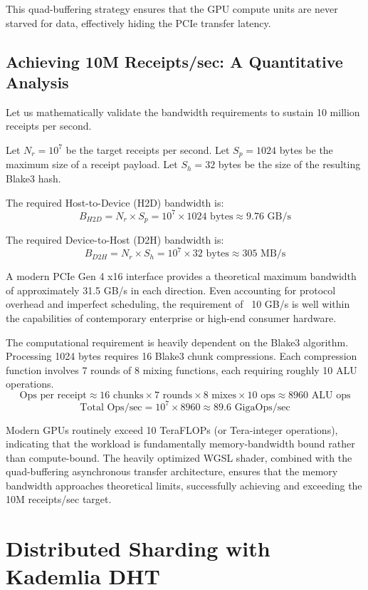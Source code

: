 This quad-buffering strategy ensures that the GPU compute units are never starved for data, effectively hiding the PCIe transfer latency.

\subsection{Achieving 10M Receipts/sec: A Quantitative Analysis}

Let us mathematically validate the bandwidth requirements to sustain 10 million receipts per second.

Let $N_r = 10^7$ be the target receipts per second.
Let $S_p = 1024$ bytes be the maximum size of a receipt payload.
Let $S_h = 32$ bytes be the size of the resulting Blake3 hash.

The required Host-to-Device (H2D) bandwidth is:
$$B_{H2D} = N_r \times S_p = 10^7 \times 1024 \text{ bytes} \approx 9.76 \text{ GB/s}$$

The required Device-to-Host (D2H) bandwidth is:
$$B_{D2H} = N_r \times S_h = 10^7 \times 32 \text{ bytes} \approx 305 \text{ MB/s}$$

A modern PCIe Gen 4 x16 interface provides a theoretical maximum bandwidth of approximately 31.5 GB/s in each direction. Even accounting for protocol overhead and imperfect scheduling, the requirement of ~10 GB/s is well within the capabilities of contemporary enterprise or high-end consumer hardware.

The computational requirement is heavily dependent on the Blake3 algorithm. Processing 1024 bytes requires 16 Blake3 chunk compressions. Each compression function involves 7 rounds of 8 mixing functions, each requiring roughly 10 ALU operations.
$$\text{Ops per receipt} \approx 16 \text{ chunks} \times 7 \text{ rounds} \times 8 \text{ mixes} \times 10 \text{ ops} \approx 8960 \text{ ALU ops}$$
$$\text{Total Ops/sec} = 10^7 \times 8960 \approx 89.6 \text{ GigaOps/sec}$$

Modern GPUs routinely exceed 10 TeraFLOPs (or Tera-integer operations), indicating that the workload is fundamentally memory-bandwidth bound rather than compute-bound. The heavily optimized WGSL shader, combined with the quad-buffering asynchronous transfer architecture, ensures that the memory bandwidth approaches theoretical limits, successfully achieving and exceeding the 10M receipts/sec target.

\section{Distributed Sharding with Kademlia DHT}

